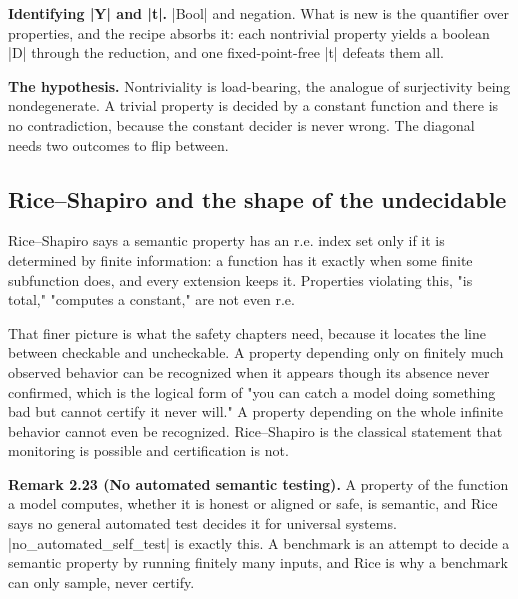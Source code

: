 \documentclass{memoir}
\begin{document}
\textbf{Identifying \LeanVerb|Y| and \LeanVerb|t|.} \LeanVerb|Bool| and negation. What is new is the quantifier
over properties, and the recipe absorbs it: each nontrivial property yields a
boolean \LeanVerb|D| through the reduction, and one fixed-point-free \LeanVerb|t| defeats them
all.

\textbf{The hypothesis.} Nontriviality is load-bearing, the analogue of surjectivity
being nondegenerate. A trivial property is decided by a constant function and
there is no contradiction, because the constant decider is never wrong. The
diagonal needs two outcomes to flip between.



\subsection{Rice–Shapiro and the shape of the undecidable}\label{Two--Schemas--of--Impossibility-005F-005F-005F--Machine--Checked--Limits--of--Trustworthy--Machine--Learning-005F-005F-005F--and--Why--They--Tighten--with--Capability----The--Classical--Limits----Rice-005F-005F-005Fs--theorem----Rice-005F-005F-005FShapiro--and--the--shape--of--the--undecidable}

Rice–Shapiro says a semantic property has an r.e. index set only if it is
determined by finite information: a function has it exactly when some finite
subfunction does, and every extension keeps it. Properties violating this, "is
total," "computes a constant," are not even r.e.

That finer picture is what the safety chapters need, because it locates the line
between checkable and uncheckable. A property depending only on finitely much
observed behavior can be recognized when it appears though its absence never
confirmed, which is the logical form of "you can catch a model doing something
bad but cannot certify it never will." A property depending on the whole
infinite behavior cannot even be recognized. Rice–Shapiro is the classical
statement that monitoring is possible and certification is not.

\textbf{Remark 2.23 (No automated semantic testing).} A property of the function a model
computes, whether it is honest or aligned or safe, is semantic, and Rice says no
general automated test decides it for universal systems.
\LeanVerb|no_automated_self_test| is exactly this. A benchmark is an attempt to decide a
semantic property by running finitely many inputs, and Rice is why a benchmark
can only sample, never certify.
\end{document}
